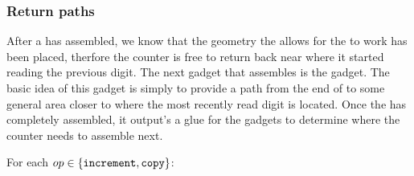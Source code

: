 

\subsubsection{ Return paths}
After a {\dtop} has assembled, we know that the geometry the allows for the {\warpunit} to
work has been placed, therfore the counter is free to return back near where it started
reading the previous digit. The next gadget that assembles is the {\returnpath} gadget.
The basic idea of this gadget is simply to provide a path from the end of {\dtop} to some
general area closer to where the most recently read digit is located. Once the {\returnpath} has
completely assembled, it output's a glue for the {\nextread} gadgets to determine
where the counter needs to assemble next.


For each $op\in \{ {\tt increment}, {\tt copy} \}$:

